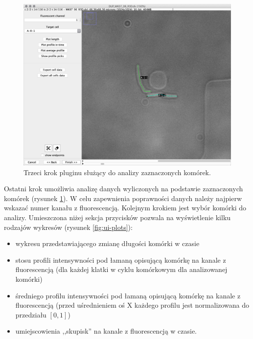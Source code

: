 \documentclass[declaration,shortabstract,mgr]{iithesis}
\begin{document}
\begin{figure}
  \centering
  \includegraphics[width=\textwidth]{images/ui-step-measurements.png}
  \caption{Trzeci krok pluginu służący do analizy zaznaczonych komórek.}
  \label{fig:ui-step-measurements}
\end{figure}

Ostatni krok umożliwia analizę danych wyliczonych na podstawie zaznaczonych komórek (rysunek \ref{fig:ui-step-measurements}).
W celu zapewnienia poprawności danych należy najpierw wskazać numer kanału z fluorescencją. Kolejnym krokiem jest wybór komórki do analizy.
Umieszczona niżej sekcja przycisków pozwala na wyświetlenie kilku rodzajów wykresów (rysunek \ref{fig:ui-plots}):

\begin{itemize}
  \item wykresu przedstawiającego zmianę długości komórki w czasie
  \item stosu profili intensywności pod łamaną opisującą komórkę na kanale z fluorescencją (dla każdej klatki w cyklu komórkowym dla analizowanej komórki)
  \item średniego profilu intensywności pod łamaną opisującą komórkę na kanale z fluorescencją (przed uśrednieniem oś X każdego profilu jest normalizowana do przedziału $[0, 1]$)
  \item umiejscowienia ,,skupisk'' na kanale z fluorescencją w czasie.
\end{itemize}
\end{document}

